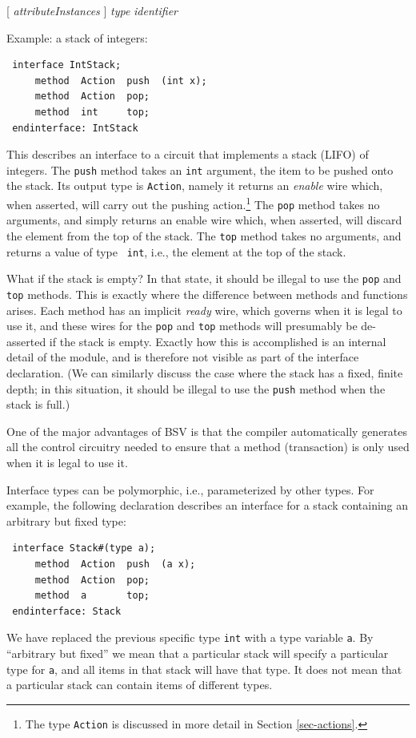 \documentclass[twoside,letterpaper]{article}
\newcommand{\hm}{\hspace*{1em}}
\newcommand{\BSV}{BSV}
\newcommand{\nterm}[1]{\emph{#1}}
\newcommand{\opt}[1]{[ #1 ]}
\newcommand{\gram}[2]{    \hm\makebox[10em][l]{\it #1}\makebox[1.5em][l]{::=}    #2}
\begin{document}
\gram{methodProtoFormal}{ \opt{ \nterm{attributeInstances} } \nterm{type} \nterm{identifier} }

Example: a stack of integers:
\begin{verbatim}
 interface IntStack;
     method  Action  push  (int x);
     method  Action  pop;
     method  int     top;
 endinterface: IntStack
\end{verbatim}
This describes an interface to a circuit that implements a stack
(LIFO) of integers.  The \texttt{push} method takes an \texttt{int}
argument, the item to be pushed onto the stack.  Its output type is
\texttt{Action}, namely it returns an \emph{enable} wire which, when
asserted, will carry out the pushing action.\footnote{
The type \texttt{Action} is discussed in more detail in Section
{\ref{sec-actions}}.}
The \texttt{pop} method
takes no arguments, and simply returns an enable wire which, when
asserted, will discard the element from the top of the stack.  The
\texttt{top} method takes no arguments, and returns a value of type {\tt
int}, i.e., the element at the top of the stack.

What if the stack is empty?  In that state, it should be illegal to
use the \texttt{pop} and \texttt{top} methods.  This is exactly where the
difference between methods and functions arises.  Each method has an
implicit \emph{ready} wire, which governs when it is legal to use it,
and these wires for the \texttt{pop} and \texttt{top} methods will
presumably be de-asserted if the stack is empty.  Exactly how this is
accomplished is an internal detail of the module, and is therefore not
visible as part of the interface declaration.  (We can similarly
discuss the case where the stack has a fixed, finite depth; in this
situation, it should be illegal to use the \texttt{push} method when
the stack is full.)

One of the major advantages of {\BSV} is that the compiler
automatically generates all the control circuitry needed to ensure
that a method (transaction) is only used when it is legal to use it.

Interface types can be polymorphic, i.e., parameterized by other
types.  For example, the following declaration describes an interface
for a stack containing an arbitrary but fixed type:
\begin{verbatim}
 interface Stack#(type a);
     method  Action  push  (a x);
     method  Action  pop;
     method  a       top;
 endinterface: Stack
\end{verbatim}
We have replaced the previous specific type \texttt{int} with a type
variable \texttt{a}.  By ``arbitrary but fixed'' we mean that a
particular stack will specify a particular type for \texttt{a}, and all
items in that stack will have that type.  It does not mean that a
particular stack can contain items of different types.
\end{document}
